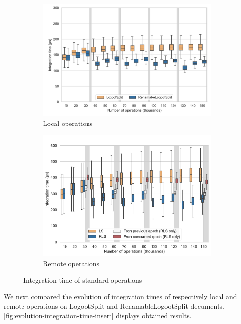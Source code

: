 \documentclass[sigplan,10pt]{acmart}
\begin{document}
\begin{figure}[ht!]
    \begin{subfigure}{\columnwidth}
        \centering
        \includegraphics[width=0.9\columnwidth]{img/integration-time-boxplot-local-operations-without-outliers.pdf}
        \caption{Local operations}
        \label{fig:evolution-integration-time-local-insert}
    \end{subfigure}
    \begin{subfigure}{\columnwidth}
        \centering
        \includegraphics[width=0.9\columnwidth]{img/integration-time-boxplot-remote-operations-without-outliers.pdf}
        \caption{Remote operations}
        \label{fig:evolution-integration-time-remote-insert}
    \end{subfigure}
    \caption{Integration time of standard operations}
    \label{fig:evolution-integration-time-insert}
\end{figure}

We next compared the evolution of integration times of respectively local and remote operations on LogootSplit and RenamableLogootSplit documents.
\autoref{fig:evolution-integration-time-insert} displays obtained results.
\end{document}
